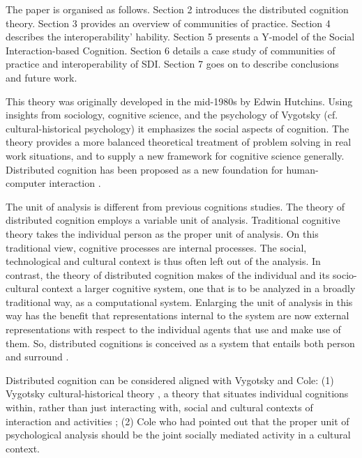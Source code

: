 \documentclass[10pt,twocolumn,ieeetran]{article}
\begin{document}


           
The paper is organised as follows. Section 2 introduces the distributed cognition theory. 
Section 3 provides an overview of communities of practice. Section 4 describes the interoperability' hability. Section 5 presents a Y-model of the Social Interaction-based Cognition. 
Section 6 details a case study of communities of practice and interoperability of SDI. 
Section 7 goes on to describe conclusions and future work.
                                       
                                                     

This theory was originally developed in the mid-1980s by Edwin Hutchins. Using insights from sociology, cognitive science, and the psychology of Vygotsky (cf. cultural-historical psychology) it emphasizes the social aspects of cognition. The theory provides a more balanced theoretical treatment of problem solving in real work situations, and to supply a new framework for cognitive science generally.
Distributed cognition has been proposed as a new foundation for human-computer interaction \cite{Hollan}. 


The unit of analysis is different from previous cognitions studies. The theory of distributed cognition employs a variable unit of analysis.  Traditional cognitive theory takes the individual person as the proper unit of analysis.  On this traditional view, cognitive processes are internal processes.  The social, technological and cultural context is thus often left out of the analysis. In contrast, the theory of distributed cognition makes of the individual and its socio-cultural context a larger cognitive system, one that is to be analyzed in a broadly traditional way, as a computational system. 
Enlarging the unit of analysis in this way has the benefit that representations internal to the system are now external representations with respect to the individual agents that use and make use of them. 
So, distributed cognitions is conceived as a system that entails both person and surround \cite{Salomon}.

Distributed cognition can be considered aligned with Vygotsky and Cole: (1) Vygotsky cultural-historical theory \cite{Wertsch}, a theory that situates individual cognitions within, rather than just interacting with, social and cultural contexts of interaction and activities \cite{Salomon}; (2) Cole who had pointed out \cite{Cole} that the proper unit of psychological analysis should be the joint socially mediated activity in a cultural context.
\end{document}
